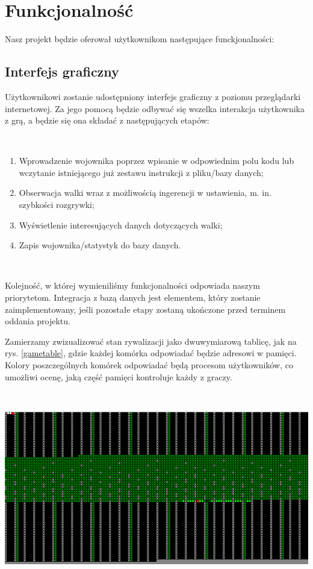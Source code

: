 {\let\clearpage\relax \chapter{Funkcjonalność}}
Nasz projekt będzie oferował użytkownikom następujące funckjonalności:

\section{Interfejs graficzny}

Użytkownikowi zostanie udostępniony interfejs graficzny z poziomu przeglądarki internetowej. Za jego pomocą będzie odbywać się wszelka interakcja użytkownika z grą, a będzie się ona składać z następujących etapów:

\
\begin{enumerate}
	\item Wprowadzenie wojownika poprzez wpisanie w odpowiednim polu kodu lub wczytanie istniejącego już zestawu instrukcji z pliku/bazy danych;

	\item Obserwacja walki wraz z możliwością ingerencji w ustawienia, m. in. szybkości rozgrywki;

	\item Wyświetlenie interesujących danych dotyczących walki;

	\item Zapis wojownika/statystyk do bazy danych.
	
\end{enumerate}

\

Kolejność, w której wymieniliśmy funkcjonalności odpowiada naszym priorytetom. Integracja z bazą danych jest elementem, który zostanie zaimplementowany, jeśli pozostałe etapy zostaną ukończone przed terminem oddania projektu.


Zamierzamy zwizualizować stan rywalizacji jako dwuwymiarową tablicę, jak na rys. \ref{gametable}, gdzie każdej komórka odpowiadać będzie adresowi w pamięci. Kolory poszczególnych komórek odpowiadać będą procesom użytkowników, co umożliwi ocenę, jaką część pamięci kontroluje każdy z graczy.

\

\includegraphics[width=\linewidth]{utils/pic1.png}
\label{gametable}

